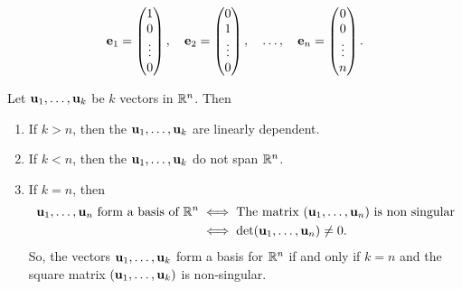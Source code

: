 \documentclass[10pt, a4paper]{article}
\begin{document}
\begin{definition}
    \[
    \mathbf{e}_1 = \begin{pmatrix}
        1 \\ 0 \\ \vdots \\ 0
    \end{pmatrix},
    \quad
    \mathbf{e}_2 = \begin{pmatrix}
        0 \\ 1 \\ \vdots \\ 0
    \end{pmatrix},
    \quad
    \dotsc,
    \quad
    \mathbf{e}_n = \begin{pmatrix}
        0 \\ 0 \\ \vdots \\ n
    \end{pmatrix}.
    \]
\end{definition}

\begin{theorem}
    Let $\mathbf{u}_1, \dotsc, \mathbf{u}_k$ be $k$ vectors in $\mathbb{R} ^ n$.
    Then
    \begin{enumerate}[label = (\roman*)]
        \item If $k > n$,
        then the $\mathbf{u}_1, \dotsc, \mathbf{u}_k$ are linearly dependent.
        \item If $k < n$,
        then the $\mathbf{u}_1, \dotsc, \mathbf{u}_k$ do not span $\mathbb{R} ^ n$.
        \item If $k = n$,
        then
        \begin{align*}
            \mathbf{u}_1, \dotsc, \mathbf{u}_n\text{ form a basis of } \mathbb{R} ^ n &\iff\text{The matrix $(\mathbf{u}_1, \dotsc, \mathbf{u}_n)$ is non singular} \\
            &\iff \det(\mathbf{u}_1, \dotsc, \mathbf{u}_n) \neq 0.
        \end{align*}
        So,
        the vectors $\mathbf{u}_1, \dotsc, \mathbf{u}_k$ form a basis for $\mathbb{R} ^ n$ if and only if $k = n$ and the square matrix $(\mathbf{u}_1, \dotsc, \mathbf{u}_k)$ is non-singular.
    \end{enumerate}
\end{theorem}
\end{document}
